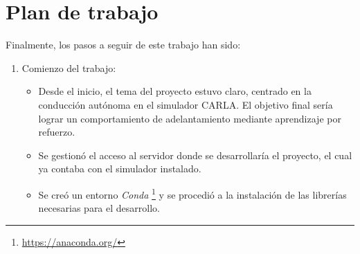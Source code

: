 \section{Plan de trabajo}
\label{sec:plantrabajo}

Finalmente, los pasos a seguir de este trabajo han sido:

\begin{enumerate}
    \item Comienzo del trabajo:
	\begin{itemize}
		\item Desde el inicio, el tema del proyecto estuvo claro, centrado en la conducción autónoma en el simulador CARLA. El objetivo final sería lograr un comportamiento de adelantamiento mediante aprendizaje por refuerzo.
		\item Se gestionó el acceso al servidor donde se desarrollaría el proyecto, el cual ya contaba con el simulador instalado.	
		\item Se creó un entorno \textit{Conda} \footnote{\url{https://anaconda.org/}} y se procedió a la instalación de las librerías necesarias para el desarrollo.
	\end{itemize}


\end{enumerate}
